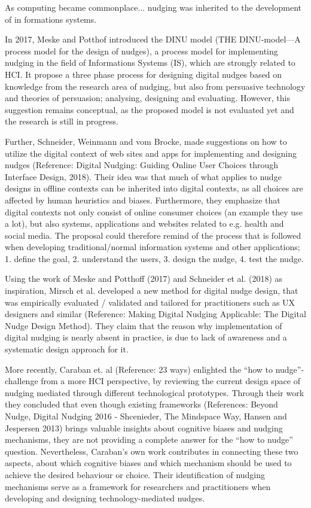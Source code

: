 As computing became commonplace... nudging was inherited to the development of in formations systems. 

In 2017, Meske and Potthof introduced the DINU model (THE DINU-model—A process model for the design of nudges), a process model for implementing nudging in the field of Informations Systems (IS), which are strongly related to HCI. It propose a three phase process for designing digital nudges based on knowledge from the research area of nudging, but also from persuasive technology and theories of persuasion; analysing, designing and evaluating. However, this suggestion remains conceptual, as the proposed model is not evaluated yet and the research is still in progress.

Further, Schneider, Weinmann and vom Brocke, made suggestions on how to utilize the digital context of web sites and apps for implementing and designing nudges (Reference: Digital Nudging: Guiding Online User Choices through Interface Design, 2018). Their idea was that much of what applies to nudge designs in offline contexts can be inherited into digital contexts, as all choices are affected by human heuristics and biases. Furthermore, they emphasize that digital contexts not only consist of online consumer choices (an example they use a lot), but also systems, applications and websites related to e.g. health and social media. The proposal could therefore remind of the process that is followed when developing traditional/normal information systems and other applications; 1. define  the  goal, 2. understand  the  users, 3. design  the  nudge,  4. test  the  nudge. 

Using the work of Meske and Potthoff (2017) and Schneider et al. (2018) as inspiration, Mirsch et al. developed a new method for digital nudge design, that was empirically evaluated / validated and tailored for practitioners such as UX designers and similar (Reference: Making Digital Nudging Applicable: The Digital Nudge Design Method). They claim that the reason why implementation of digital nudging is nearly absent in practice, is due to lack of awareness and a systematic design approach for it.

More recently, Caraban et. al (Reference: 23 ways) enlighted the “how to nudge”-challenge from a more HCI perspective, by reviewing the current design space of nudging mediated through different technological prototypes. Through their work they concluded that even though existing frameworks (References: Beyond Nudge, Digital Nudging 2016 - Shcenieder, The Mindspace Way, Hansen and Jespersen 2013) brings valuable insights about cognitive biases and nudging mechanisms, they are not providing a complete answer for the “how to nudge” question. Nevertheless, Caraban’s own work contributes in connecting these two aspects, about which cognitive biases and which mechanism should be used to achieve the desired behaviour or choice. Their identification of nudging mechanisms serve as a framework for researchers and practitioners when developing and designing technology-mediated nudges. %

